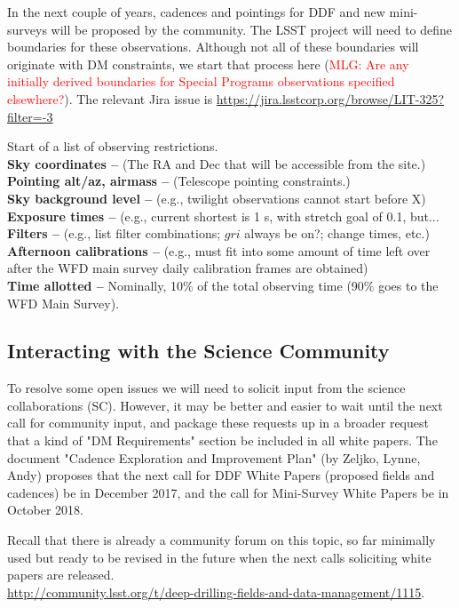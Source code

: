 \documentclass[DM,lsstdraft,toc]{lsstdoc}
\begin{document}
In the next couple of years, cadences and pointings for DDF and new mini-surveys will be proposed by the community. The LSST project will need to define boundaries for these observations. Although not all of these boundaries will originate with DM constraints, we start that process here (\textcolor{red}{MLG: Are any initially derived boundaries for Special Programs observations specified elsewhere?}). The relevant Jira issue is \url{https://jira.lsstcorp.org/browse/LIT-325?filter=-3}

Start of a list of observing restrictions. \\
\textbf{Sky coordinates --} (The RA and Dec that will be accessible from the site.) \\
\textbf{Pointing alt/az, airmass --} (Telescope pointing constraints.) \\
\textbf{Sky background level --} (e.g., twilight observations cannot start before X) \\
\textbf{Exposure times --} (e.g., current shortest is 1 s, with stretch goal of 0.1, but... \\
\textbf{Filters --} (e.g., list filter combinations; $gri$ always be on?; change times, etc.) \\
\textbf{Afternoon calibrations --} (e.g., must fit into some amount of time left over after the WFD main survey daily calibration frames are obtained) \\
\textbf{Time allotted --} Nominally, 10\% of the total observing time (90\% goes to the WFD Main Survey). \\

\subsection{Interacting with the Science Community} \label{ssec:intro_forum}

To resolve some open issues we will need to solicit input from the science collaborations (SC). However, it may be better and easier to wait until the next call for community input, and package these requests up in a broader request that a kind of "DM Requirements" section be included in all white papers. The document "Cadence Exploration and Improvement Plan" (by Zeljko, Lynne, Andy) proposes that the next call for DDF White Papers (proposed fields and cadences) be in December 2017, and the call for Mini-Survey White Papers be in October 2018. 

\noindent Recall that there is already a community forum on this topic, so far minimally used but ready to be revised in the future when the next calls soliciting white papers are released. \\ \url{http://community.lsst.org/t/deep-drilling-fields-and-data-management/1115}.
\end{document}
